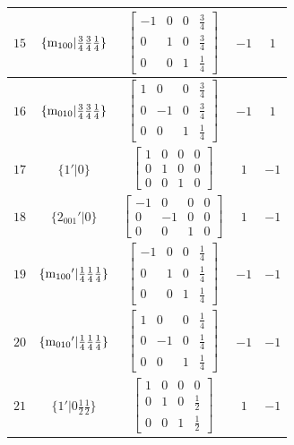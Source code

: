 \documentclass[fleqn,8pt]{jsarticle}
\begin{document}
\begin{longtable}{ccccc}
$ 15 $ & $ \{{\rm m}_{100}|\frac{3}{4} \frac{3}{4} \frac{1}{4}\} $ & $ \begin{bmatrix} -1 & 0 & 0 & \frac{3}{4} \\ 0 & 1 & 0 & \frac{3}{4} \\ 0 & 0 & 1 & \frac{1}{4} \end{bmatrix} $ & $ -1 $ & $ 1 $ \\ \hline
$ 16 $ & $ \{{\rm m}_{010}|\frac{3}{4} \frac{3}{4} \frac{1}{4}\} $ & $ \begin{bmatrix} 1 & 0 & 0 & \frac{3}{4} \\ 0 & -1 & 0 & \frac{3}{4} \\ 0 & 0 & 1 & \frac{1}{4} \end{bmatrix} $ & $ -1 $ & $ 1 $ \\ \hline
$ 17 $ & $ \{1{}'|0\} $ & $ \begin{bmatrix} 1 & 0 & 0 & 0 \\ 0 & 1 & 0 & 0 \\ 0 & 0 & 1 & 0 \end{bmatrix} $ & $ 1 $ & $ -1 $ \\ \hline
$ 18 $ & $ \{2{}_{001}{}'|0\} $ & $ \begin{bmatrix} -1 & 0 & 0 & 0 \\ 0 & -1 & 0 & 0 \\ 0 & 0 & 1 & 0 \end{bmatrix} $ & $ 1 $ & $ -1 $ \\ \hline
$ 19 $ & $ \{{\rm m}_{100}{}'|\frac{1}{4} \frac{1}{4} \frac{1}{4}\} $ & $ \begin{bmatrix} -1 & 0 & 0 & \frac{1}{4} \\ 0 & 1 & 0 & \frac{1}{4} \\ 0 & 0 & 1 & \frac{1}{4} \end{bmatrix} $ & $ -1 $ & $ -1 $ \\ \hline
$ 20 $ & $ \{{\rm m}_{010}{}'|\frac{1}{4} \frac{1}{4} \frac{1}{4}\} $ & $ \begin{bmatrix} 1 & 0 & 0 & \frac{1}{4} \\ 0 & -1 & 0 & \frac{1}{4} \\ 0 & 0 & 1 & \frac{1}{4} \end{bmatrix} $ & $ -1 $ & $ -1 $ \\ \hline
$ 21 $ & $ \{1{}'|0 \frac{1}{2} \frac{1}{2}\} $ & $ \begin{bmatrix} 1 & 0 & 0 & 0 \\ 0 & 1 & 0 & \frac{1}{2} \\ 0 & 0 & 1 & \frac{1}{2} \end{bmatrix} $ & $ 1 $ & $ -1 $ \\ \hline

\end{longtable}
\end{document}
